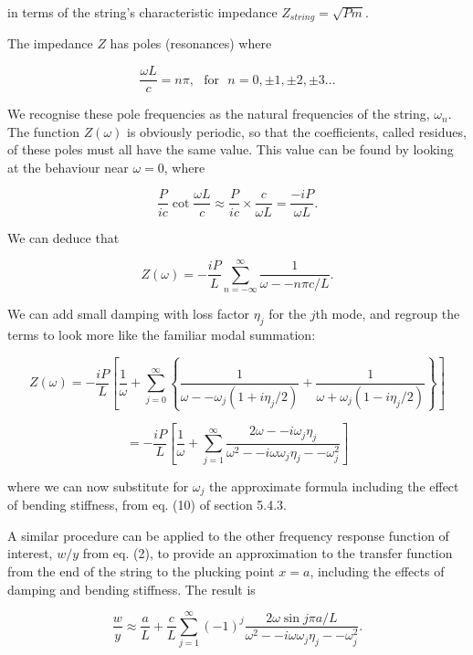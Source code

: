   \noindent{}in terms of the string's characteristic impedance 
  $Z_{string}=\sqrt{Pm}$. 

  The impedance $Z$ has poles (resonances) where 

  \begin{equation*}\frac{\omega L}{c} = n \pi, \mathrm{~~~for~~~}n=0, \pm 1,\pm 
  2,\pm 3... \tag{5}\end{equation*} 

  We recognise these pole frequencies as the natural frequencies of the string, 
  $\omega_n$. The function $Z(\omega)$ is obviously periodic, so that the 
  coefficients, called residues, of these poles must all have the same value. 
  This value can be found by looking at the behaviour near $\omega=0$, where 

  \begin{equation*}\frac{P}{ic}\cot \frac{\omega L}{c} \approx \frac{P}{ic} 
  \times \frac{c}{\omega L}=\frac{-iP}{\omega L}. \tag{6}\end{equation*} 

  We can deduce that 

  \begin{equation*}Z(\omega) = -\frac{iP}{L} 
  \sum_{n=-\infty}^{\infty}{\dfrac{1}{\omega -- n \pi c/L}} . 
  \tag{7}\end{equation*} 

  We can add small damping with loss factor $\eta_j$ for the $j$th mode, and 
  regroup the terms to look more like the familiar modal summation: 

  \begin{equation*}Z(\omega) = -\frac{iP}{L} \left[ \frac{1}{\omega} + 
  \sum_{j=0}^{\infty}{\left\lbrace \dfrac{1}{\omega -- \omega_j(1+i \eta_j 
  /2)}+\dfrac{1}{\omega + \omega_j(1-i \eta_j /2)}\right\rbrace} \right] 
  \end{equation*} 

  \begin{equation*}=-\frac{iP}{L} \left[ \frac{1}{\omega} + 
  \sum_{j=1}^{\infty}{ \dfrac{2 \omega -- i \omega_j \eta_j}{\omega^2 -- 
  i\omega \omega_j \eta_j -- \omega_j^2}} \right] \tag{8}\end{equation*} 

  \noindent{}where we can now substitute for $\omega_j$ the approximate formula 
  including the effect of bending stiffness, from eq. (10) of section 5.4.3. 

  A similar procedure can be applied to the other frequency response function 
  of interest, $w/y$ from eq. (2), to provide an approximation to the transfer 
  function from the end of the string to the plucking point $x=a$, including 
  the effects of damping and bending stiffness. The result is 

  \begin{equation*}\frac{w}{y} \approx \frac{a}{L} + 
  \frac{c}{L}\sum_{j=1}^{\infty}{ (-1)^j \dfrac{2 \omega \sin j \pi 
  a/L}{\omega^2 -- i\omega \omega_j \eta_j -- \omega_j^2}} . 
  \tag{9}\end{equation*} 